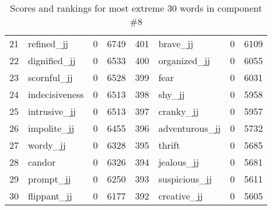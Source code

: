 \begin{table}[tbp]
\begin{tabular}{| rlr@{.}l | rlr@{.}l |}
    21 & refined\_jj & 0 & 6749    &    401 & brave\_jj & 0 & 6109 \\
    22 & dignified\_jj & 0 & 6533    &    400 & organized\_jj & 0 & 6055 \\
    23 & scornful\_jj & 0 & 6528    &    399 & fear & 0 & 6031 \\
    24 & indecisiveness & 0 & 6513    &    398 & shy\_jj & 0 & 5958 \\
    25 & intrusive\_jj & 0 & 6513    &    397 & cranky\_jj & 0 & 5957 \\
    26 & impolite\_jj & 0 & 6455    &    396 & adventurous\_jj & 0 & 5732 \\
    27 & wordy\_jj & 0 & 6328    &    395 & thrift & 0 & 5685 \\
    28 & candor & 0 & 6326    &    394 & jealous\_jj & 0 & 5681 \\
    29 & prompt\_jj & 0 & 6250    &    393 & suspicious\_jj & 0 & 5611 \\
    30 & flippant\_jj & 0 & 6177    &    392 & creative\_jj & 0 & 5605 \\
    \hline
    \end{tabular}
    \caption{Scores and rankings for most extreme 30 words in component \#8} 
\end{table}
\clearpage
